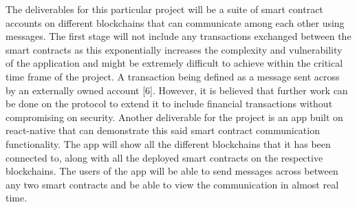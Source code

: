 \documentclass[a4paper,twoside,phd]{BYUPhys}
\begin{document}
The deliverables for this particular project will be a suite of smart contract accounts on different blockchains that can communicate among each other using messages. The first stage will not include any transactions exchanged between the smart contracts as this exponentially increases the complexity and vulnerability of the application and might be extremely difficult to achieve within the critical time frame of the project. A transaction being defined as a message sent across by an externally owned account [6]. However, it is believed that further work can be done on the protocol to extend it to include financial transactions without compromising on security. Another deliverable for the project is an app built on react-native that can demonstrate this said smart contract communication functionality. The app will show all the different blockchains that it has been connected to, along with all the deployed smart contracts on the respective blockchains. The users of the app will be able to send messages across between any two smart contracts and be able to view the communication in almost real time.
\end{document}
